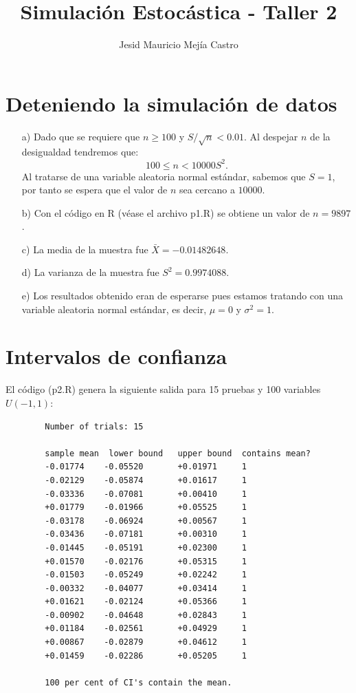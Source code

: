 \documentclass[11pt,letterpaper]{article}
\title{Simulación Estocástica - Taller 2}
\author{Jesid Mauricio Mejía Castro}
\begin{document}
	\maketitle
	
	\section{Deteniendo la simulación de datos}	
	\begin{itemize}
		\item[a)] Dado que se requiere que $n \geq 100$ y $S/\sqrt{n} < 0.01$. Al despejar $n$ de la desigualdad tendremos que:
		\[ 100 \leq n < 10000S^2 \text{.} \]
		Al tratarse de una variable aleatoria normal estándar, sabemos que $S = 1$, por tanto se espera que el valor de $n$ sea cercano a $10000$.
		\item[b)] Con el código en R (véase el archivo {\ttfamily p1.R}) se obtiene un valor de $n=9897$.
		\item[c)] La media de la muestra fue $\bar{X}=-0.01482648$.
		\item[d)] La varianza de la muestra fue $S^2=0.9974088$.
		\item[e)] Los resultados obtenido eran de esperarse pues estamos tratando con una variable aleatoria normal estándar, es decir, $\mu=0$ y $\sigma^2=1$.
	\end{itemize}

	\newpage

	\section{Intervalos de confianza}
	El código ({\ttfamily p2.R}) genera la siguiente salida para 15 pruebas y 100 variables $U(-1,1)$:
	
	\begin{verbatim}
		Number of trials: 15
		
		sample mean  lower bound   upper bound  contains mean?
		-0.01774    -0.05520       +0.01971     1
		-0.02129    -0.05874       +0.01617     1
		-0.03336    -0.07081       +0.00410     1
		+0.01779    -0.01966       +0.05525     1
		-0.03178    -0.06924       +0.00567     1
		-0.03436    -0.07181       +0.00310     1
		-0.01445    -0.05191       +0.02300     1
		+0.01570    -0.02176       +0.05315     1
		-0.01503    -0.05249       +0.02242     1
		-0.00332    -0.04077       +0.03414     1
		+0.01621    -0.02124       +0.05366     1
		-0.00902    -0.04648       +0.02843     1
		+0.01184    -0.02561       +0.04929     1
		+0.00867    -0.02879       +0.04612     1
		+0.01459    -0.02286       +0.05205     1
		
		100 per cent of CI's contain the mean.
	\end{verbatim}
\end{document}
